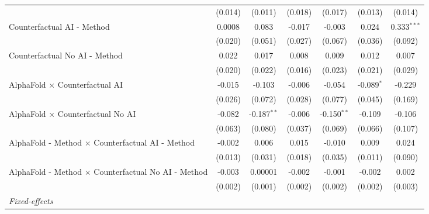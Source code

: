 \begin{tabular}{lcccccc}
                                                              & (0.014)       & (0.011)        & (0.018)       & (0.017)       & (0.013)       & (0.014)\\   
   Counterfactual AI - Method                                 & 0.0008        & 0.083          & -0.017        & -0.003        & 0.024         & 0.333$^{***}$\\   
                                                              & (0.020)       & (0.051)        & (0.027)       & (0.067)       & (0.036)       & (0.092)\\   
   Counterfactual No AI - Method                              & 0.022         & 0.017          & 0.008         & 0.009         & 0.012         & 0.007\\   
                                                              & (0.020)       & (0.022)        & (0.016)       & (0.023)       & (0.021)       & (0.029)\\   
   AlphaFold $\times$ Counterfactual AI                       & -0.015        & -0.103         & -0.006        & -0.054        & -0.089$^{*}$  & -0.229\\   
                                                              & (0.026)       & (0.072)        & (0.028)       & (0.077)       & (0.045)       & (0.169)\\   
   AlphaFold $\times$ Counterfactual No AI                    & -0.082        & -0.187$^{**}$  & -0.006        & -0.150$^{**}$ & -0.109        & -0.106\\   
                                                              & (0.063)       & (0.080)        & (0.037)       & (0.069)       & (0.066)       & (0.107)\\   
   AlphaFold - Method $\times$ Counterfactual AI - Method     & -0.002        & 0.006          & 0.015         & -0.010        & 0.009         & 0.024\\   
                                                              & (0.013)       & (0.031)        & (0.018)       & (0.035)       & (0.011)       & (0.090)\\   
   AlphaFold - Method $\times$ Counterfactual No AI - Method  & -0.003        & 0.00001        & -0.002        & -0.001        & -0.002        & 0.002\\   
                                                              & (0.002)       & (0.001)        & (0.002)       & (0.002)       & (0.002)       & (0.003)\\   
   \midrule
   \emph{Fixed-effects}\\

\end{tabular}
